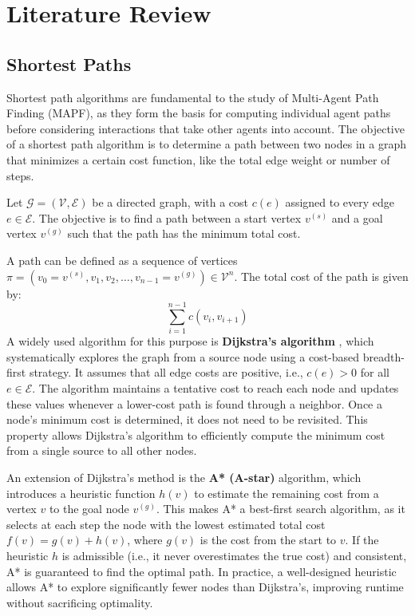 \section{Literature Review}
\subsection{Shortest Paths}
Shortest path algorithms are fundamental to the study of Multi-Agent Path Finding (MAPF), as they form the basis for computing individual agent paths before considering interactions that take other agents into account. The objective of a shortest path algorithm is to determine a path between two nodes in a graph that minimizes a certain cost function, like the total edge weight or number of steps.

Let \( \mathcal{G} = (\mathcal{V}, \mathcal{E}) \) be a directed graph, with a cost \( c(e) \) assigned to every edge \( e \in \mathcal{E} \). The objective is to find a path between a start vertex \( v^{(s)} \) and a goal vertex \( v^{(g)} \) such that the path has the minimum total cost.

A path can be defined as a sequence of vertices \( \pi = (v_0 = v^{(s)}, v_1, v_2, \ldots, v_{n-1} = v^{(g)}) \in \mathcal{V}^n \). The total cost of the path is given by:
\[
\sum_{i=1}^{n-1} c(v_i, v_{i+1}) \tag{1}
\] 
A widely used algorithm for this purpose is \textbf{Dijkstra's algorithm} \cite{dijkstraNoteTwoProblems1959}, which systematically explores the graph from a source node using a cost-based breadth-first strategy. It assumes that all edge costs are positive, i.e., \( c(e) > 0 \) for all \( e \in \mathcal{E} \). The algorithm maintains a tentative cost to reach each node and updates these values whenever a lower-cost path is found through a neighbor. Once a node's minimum cost is determined, it does not need to be revisited. This property allows Dijkstra's algorithm to efficiently compute the minimum cost from a single source to all other nodes.

An extension of Dijkstra's method is the \textbf{A* (A-star)} \cite{hartFormalBasisHeuristic1968} algorithm, which introduces a heuristic function \( h(v) \) to estimate the remaining cost from a vertex \( v \) to the goal node \( v^{(g)} \). This makes A* a best-first search algorithm, as it selects at each step the node with the lowest estimated total cost \( f(v) = g(v) + h(v) \), where \( g(v) \) is the cost from the start to \( v \). If the heuristic \( h \) is admissible (i.e., it never overestimates the true cost) and consistent, A* is guaranteed to find the optimal path. In practice, a well-designed heuristic allows A* to explore significantly fewer nodes than Dijkstra's, improving runtime without sacrificing optimality. 

